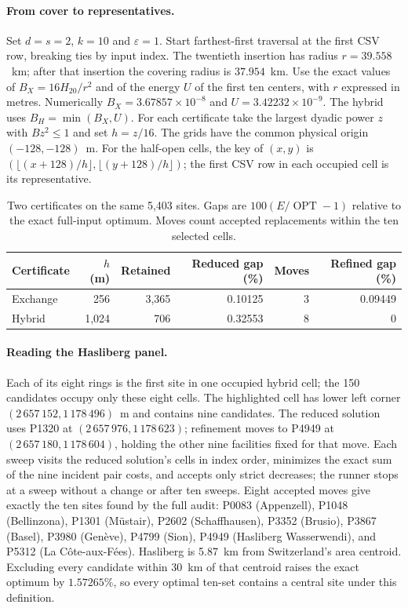 \documentclass[a4paper,12pt]{article}
\newcommand{\OPT}{\operatorname{OPT}}
\numberwithin{equation}{section}
\begin{document}
\paragraph{From cover to representatives.}
Set $d=s=2$, $k=10$ and $\varepsilon=1$. Start farthest-first traversal at the
first CSV row, breaking ties by input index. The twentieth insertion has radius
$r=39.558$~km; after that insertion the covering radius is $37.954$~km.
Use the exact values of $B_X=16H_{20}/r^2$ and of the energy $U$ of the first ten
centers, with $r$ expressed in metres. Numerically $B_X=3.67857\times10^{-8}$
and $U=3.42232\times10^{-9}$. The hybrid uses $B_H=\min(B_X,U)$. For each
certificate take the largest dyadic power $z$ with $Bz^2\le1$ and set $h=z/16$.
The grids have the common physical origin $(-128,-128)$~m. For the half-open cells,
the key of $(x,y)$ is $(\lfloor(x+128)/h\rfloor,\lfloor(y+128)/h\rfloor)$;
the first CSV row in each occupied cell is its representative.

\begin{table}[!htbp]\centering\small
\caption{Two certificates on the same 5,403 sites. Gaps are $100(E/\OPT-1)$
relative to the exact full-input optimum. Moves count accepted replacements within
the ten selected cells.}\label{tab:swiss-dense}
\begin{tabular}{@{}lrrrrr@{}}\toprule
Certificate & $h$ (m) & Retained & Reduced gap (\%) & Moves & Refined gap (\%)\\\midrule
Exchange & 256 & 3,365 & 0.10125 & 3 & 0.09449\\
Hybrid & 1,024 & 706 & 0.32553 & 8 & 0\\\bottomrule
\end{tabular}\end{table}

\paragraph{Reading the Hasliberg panel.}
Each of its eight rings is the first site in one occupied hybrid cell; the
150 candidates occupy only these eight cells. The highlighted cell has lower
left corner $(2\,657\,152,1\,178\,496)$~m and contains nine candidates.
The reduced solution uses P1320 at $(2\,657\,976,1\,178\,623)$; refinement moves
to P4949 at $(2\,657\,180,1\,178\,604)$, holding the other nine facilities fixed
for that move. Each sweep visits the reduced solution's cells in index order,
minimizes the exact sum of the nine incident pair costs, and accepts only strict
decreases; the runner stops at a sweep without a change or after ten sweeps.
Eight accepted moves give exactly the ten sites found by the full audit:
P0083 (Appenzell), P1048 (Bellinzona), P1301 (Müstair), P2602 (Schaffhausen),
P3352 (Brusio), P3867 (Basel), P3980 (Genève), P4799 (Sion),
P4949 (Hasliberg Wasserwendi), and P5312 (La Côte-aux-Fées).
Hasliberg is 5.87~km from Switzerland's area centroid. Excluding every candidate
within 30~km of that centroid raises the exact optimum by $1.57265\%$,
so every optimal ten-set contains a central site under this definition.
\end{document}
